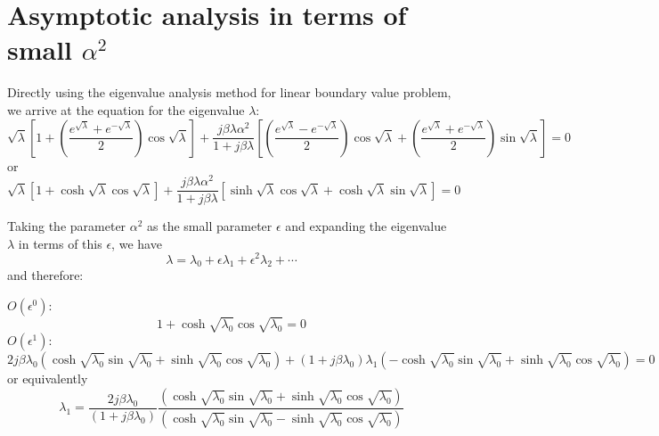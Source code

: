 \documentclass{article}
\begin{document}
\section{Asymptotic analysis in terms of small $\alpha^2$}
Directly using the eigenvalue analysis method for linear boundary value problem, we arrive at the equation for the eigenvalue $\lambda$:
\begin{equation}
    \sqrt{\lambda} \left[ 1 + \left( \frac{e^{\sqrt{\lambda}} + e^{-\sqrt{\lambda}} }{2} \right) \cos \sqrt{\lambda} \right] + \frac{j \beta \lambda \alpha^2}{1 + j \beta \lambda} \left[ \left( \frac{e^{\sqrt{\lambda}} - e^{-\sqrt{\lambda}} }{2} \right) \cos \sqrt{\lambda} + \left( \frac{e^{\sqrt{\lambda}} + e^{-\sqrt{\lambda}} }{2} \right) \sin \sqrt{\lambda} \right] = 0
\end{equation}
or
\begin{equation}
    \sqrt{\lambda} \left[ 1 + \cosh \sqrt{\lambda} \cos \sqrt{\lambda} \right] + \frac{j \beta \lambda \alpha^2}{1 + j \beta \lambda} \left[ \sinh \sqrt{\lambda} \cos \sqrt{\lambda} + \cosh \sqrt{\lambda} \sin \sqrt{\lambda} \right] = 0
\end{equation}

Taking the parameter $\alpha^2$ as the small parameter $\epsilon$ and expanding the eigenvalue $\lambda$ in terms of this $\epsilon$, we have 
\begin{equation}
    \lambda = \lambda_0 + \epsilon \lambda_1 + \epsilon^2 \lambda_2 + \cdots
\end{equation}
and therefore:

\noindent
$O(\epsilon^0)$:
\begin{equation}
    1 + \cosh{\sqrt{\lambda_0}} \cos{\sqrt{\lambda_0}} = 0
\end{equation}
$O(\epsilon^1)$:
\begin{equation}
    2j \beta \lambda_0 \left( \cosh{\sqrt{\lambda_0}} \sin{\sqrt{\lambda_0}} + \sinh{\sqrt{\lambda_0}} \cos{\sqrt{\lambda_0}} \right) + (1+ j \beta \lambda_0)\lambda_1 \left( -\cosh{\sqrt{\lambda_0}} \sin{\sqrt{\lambda_0}} + \sinh{\sqrt{\lambda_0}} \cos{\sqrt{\lambda_0}} \right) = 0
\end{equation}
or equivalently
\begin{equation}
    \lambda_1 = \frac{ 2j \beta \lambda_0 }{ (1+ j \beta \lambda_0) } \frac{ \left( \cosh{\sqrt{\lambda_0}} \sin{\sqrt{\lambda_0}} + \sinh{\sqrt{\lambda_0}} \cos{\sqrt{\lambda_0}} \right) }{ \left( \cosh{\sqrt{\lambda_0}} \sin{\sqrt{\lambda_0}} - \sinh{\sqrt{\lambda_0}} \cos{\sqrt{\lambda_0}} \right) }
\end{equation}
\end{document}
